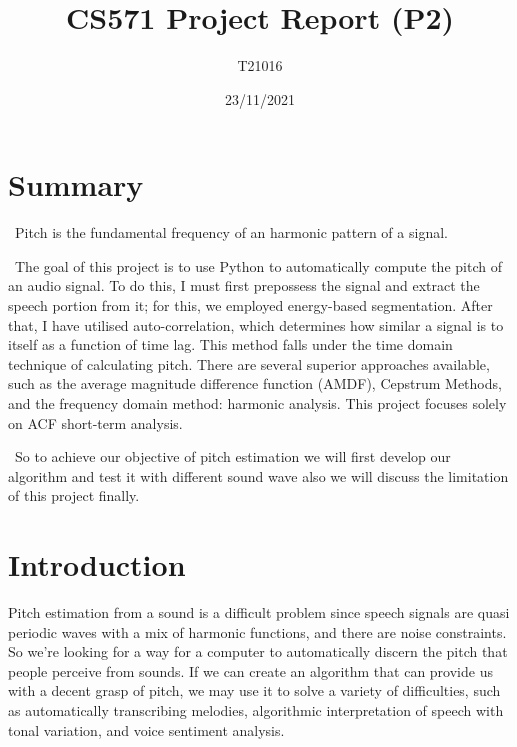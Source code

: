 \documentclass[11pt,a4paper]{report}
\title{CS571 Project Report (P2)}
\author{T21016}
\date{23/11/2021}
\begin{document}
\maketitle
\section{Summary}
\ Pitch is the fundamental frequency of an harmonic pattern of a signal.


\  The goal of this project is to use Python to automatically compute the pitch of an audio signal. To do this, I must first prepossess the signal and extract the speech portion from it; for this, we employed energy-based segmentation. After that, I have utilised auto-correlation, which determines how similar a signal is to itself as a function of time lag. This method falls under the time domain technique of calculating pitch. There are several superior approaches available, such as the average magnitude difference function (AMDF), Cepstrum Methods, and the frequency domain method: harmonic analysis. This project focuses solely on ACF short-term analysis.


\ So to achieve our objective of pitch estimation we will first develop our algorithm and test it with different sound wave also we will discuss the limitation of this project finally.
 
\section{Introduction}
Pitch estimation from a sound is a difficult problem since speech signals are quasi periodic waves with a mix of harmonic functions, and there are noise constraints. So we're looking for a way for a computer to automatically discern the pitch that people perceive from sounds. If we can create an algorithm that can provide us with a decent grasp of pitch, we may use it to solve a variety of difficulties, such as automatically transcribing melodies, algorithmic interpretation of speech with tonal variation, and voice sentiment analysis.
\end{document}
